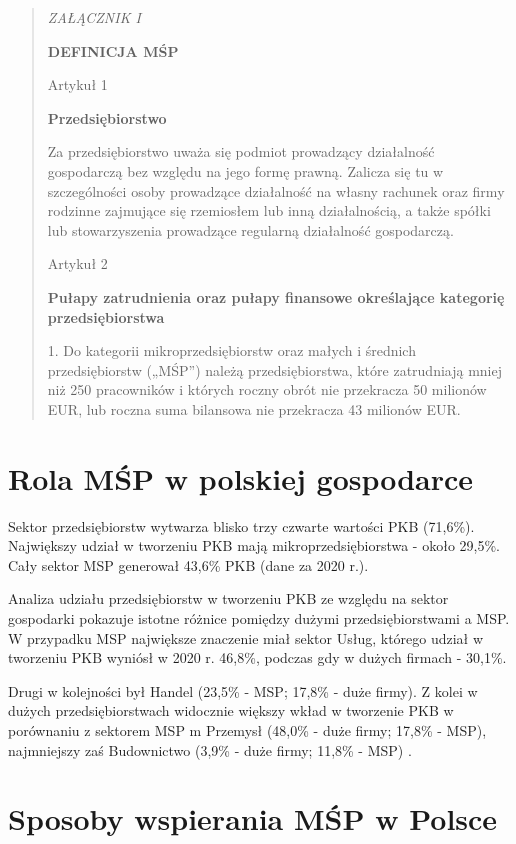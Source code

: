 \documentclass[11pt]{article}
\newenvironment{itquote}
  {\begin{quote} \begin{center}\itshape}
  {\end{center}  \end{quote}   \ignorespacesafterend}
\begin{document}
\begin{itquote}
    ZAŁĄCZNIK I

    \textbf{DEFINICJA MŚP}

    Artykuł 1

    \textbf{Przedsiębiorstwo}

    Za przedsiębiorstwo uważa się podmiot prowadzący działalność gospodarczą bez względu na jego formę prawną.
    Zalicza się tu w szczególności osoby prowadzące działalność na własny rachunek oraz firmy rodzinne zajmujące się rzemiosłem lub inną działalnością,
    a także spółki lub stowarzyszenia prowadzące regularną działalność gospodarczą.
    
    Artykuł 2

    \textbf{Pułapy zatrudnienia oraz pułapy finansowe określające kategorię przedsiębiorstwa}

    1. Do kategorii mikroprzedsiębiorstw oraz małych i średnich przedsiębiorstw („MŚP”) należą przedsiębiorstwa,
    które zatrudniają mniej niż 250 pracowników i których roczny obrót nie przekracza 50 milionów EUR, lub roczna
    suma bilansowa nie przekracza 43 milionów EUR.
\end{itquote}

\section*{Rola MŚP w polskiej gospodarce}

Sektor przedsiębiorstw wytwarza blisko trzy czwarte wartości PKB (71,6\%). Największy udział w tworzeniu
PKB mają mikroprzedsiębiorstwa - około 29,5\%. Cały sektor MSP generował 43,6\% PKB (dane za 2020 r.)\cite{RaportPARPoMSP}.
\medskip

Analiza udziału przedsiębiorstw w tworzeniu PKB ze względu na sektor gospodarki pokazuje istotne różnice
pomiędzy dużymi przedsiębiorstwami a MSP. W przypadku MSP największe znaczenie miał sektor Usług, którego udział w tworzeniu PKB wyniósł
w 2020 r. 46,8\%, podczas gdy w dużych firmach - 30,1\%.

Drugi w kolejności był Handel (23,5\% - MSP; 17,8\% - duże
firmy). Z kolei w dużych przedsiębiorstwach widocznie większy wkład w tworzenie PKB
w porównaniu z sektorem MSP m Przemysł (48,0\% - duże firmy; 17,8\% - MSP),
najmniejszy zaś Budownictwo (3,9\% - duże firmy; 11,8\% - MSP) \cite{RaportPARPoMSP}. 

\section*{Sposoby wspierania MŚP w Polsce}
\end{document}
